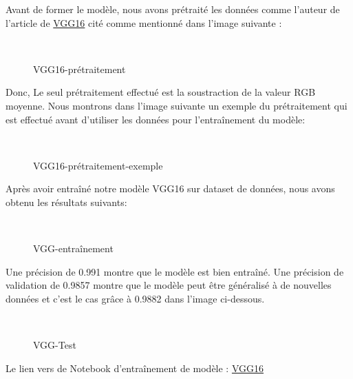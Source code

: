{Avant de former le modèle, nous avons prétraité les données comme l'auteur de l'article de \href{https://arxiv.org/pdf/1409.1556.pdf}{VGG16} cité comme mentionné dans l'image suivante :

\begin{figure}[H] 
\centering
{}\\[0.5cm]
\caption{VGG16-prétraitement}
\label{fig:figure19}
\end{figure}
Donc, Le seul prétraitement effectué est la soustraction de la valeur RGB moyenne. Nous montrons dans l'image suivante un exemple du prétraitement qui est effectué avant d'utiliser les données pour l'entraînement du modèle:
\begin{figure}[H] 
\centering
{}\\[0.5cm]
\caption{VGG16-prétraitement-exemple}
\label{fig:figure19}
\end{figure}


Après avoir entraîné notre modèle VGG16 sur dataset de données, nous avons obtenu les résultats suivants:
\begin{figure}[H] 
\centering
{}\\[0.5cm]
\caption{VGG-entraînement}
\label{fig:figure14}
\end{figure}


Une précision de 0.991 montre que le modèle est bien entraîné.  Une précision de validation de 0.9857 montre que le modèle peut être généralisé à de nouvelles données et c'est le cas grâce à 0.9882 dans l'image ci-dessous.

\begin{figure}[H] 
\centering
{}\\[0.5cm]
\caption{VGG-Test}
\label{fig:figure14}
\end{figure}


Le lien vers de Notebook d'entraînement de modèle : 
\href{https://github.com/mohammedAljadd/iEars/blob/main/Model%20training/Face%20identification/3-VGG%2016.ipynb}{VGG16}


}
